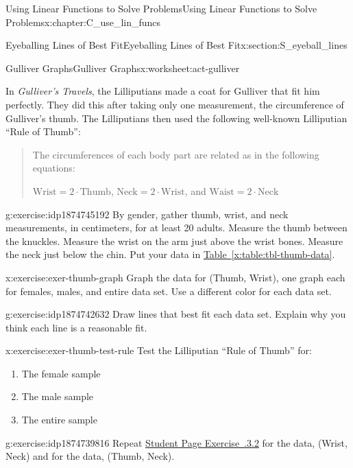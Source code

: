 \documentclass[oneside,10pt,]{book}
\newcommand{\xreffont}{\relax}
\newcommand{\pubtitle}[1]{\textsl{#1}}
\numberwithin{equation}{chapter}
\begin{document}
\begin{chapterptx}{Using Linear Functions to Solve Problems}{}{Using Linear Functions to Solve Problems}{}{}{x:chapter:C_use_lin_funcs}
\begin{sectionptx}{Eyeballing Lines of Best Fit}{}{Eyeballing Lines of Best Fit}{}{}{x:section:S_eyeball_lines}
\begin{worksheet-subsection}{Gulliver Graphs}{}{Gulliver Graphs}{}{}{x:worksheet:act-gulliver}
\begin{introduction}{}
In \pubtitle{Gulliver’s Travels}, the Lilliputians made a coat for Gulliver that fit him perfectly. They did this after taking only one measurement, the circumference of Gulliver's thumb. The Lilliputians then used the following well-known Lilliputian ``Rule of Thumb'': \begin{quote}%
The circumferences of each body part are related as in the following equations:%
\par
\(\text{Wrist} = 2 \cdot \text{Thumb}\), \(\text{Neck} = 2 \cdot \text{Wrist}\), and \(\text{Waist} = 2 \cdot \text{Neck}\)%
\end{quote}
%
\end{introduction}%
\begin{divisionexercise}{1}{}{}{g:exercise:idp1874745192}%
By gender, gather thumb, wrist, and neck measurements, in centimeters, for at least 20 adults. Measure the thumb between the knuckles. Measure the wrist on the arm just above the wrist bones. Measure the neck just below the chin. Put your data in \hyperref[x:table:tbl-thumb-data]{Table~{\xreffont\ref{x:table:tbl-thumb-data}}}.%
\end{divisionexercise}%
\begin{divisionexercise}{2}{}{}{x:exercise:exer-thumb-graph}%
Graph the data for (Thumb, Wrist), one graph each for females, males, and entire data set. Use a different color for each data set.%
\end{divisionexercise}%
\begin{divisionexercise}{3}{}{}{g:exercise:idp1874742632}%
Draw lines that best fit each data set. Explain why you think each line is a reasonable fit.%
\end{divisionexercise}%
\begin{divisionexercise}{4}{}{}{x:exercise:exer-thumb-test-rule}%
Test the Lilliputian ``Rule of Thumb'' for:\begin{enumerate}[font=\bfseries,label=(\alph*),ref=\alph*]
\item{}The female sample%
\item{}The male sample%
\item{}The entire sample%
\end{enumerate}
\end{divisionexercise}%
\begin{divisionexercise}{5}{}{}{g:exercise:idp1874739816}%
Repeat \hyperlink{x:exercise:exer-thumb-graph}{Student Page Exercise~{\xreffont 3.3.3.2}\textendash{}{\xreffont 3.3.3.4}} for the data, (Wrist, Neck) and for the data, (Thumb, Neck).%
\end{divisionexercise}%

\end{worksheet-subsection}
\end{sectionptx}
\end{chapterptx}
\end{document}
